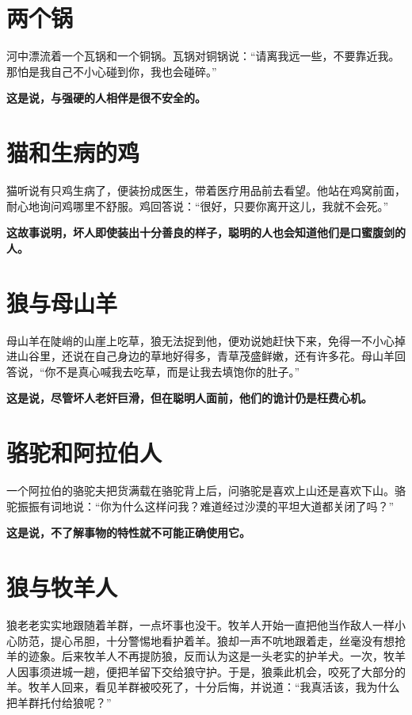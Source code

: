 \section{两个锅}

河中漂流着一个瓦锅和一个铜锅。瓦锅对铜锅说：“请离我远一些，不要靠近我。那怕是我自己不小心碰到你，我也会碰碎。”

{\bfseries \color{red}这是说，与强硬的人相伴是很不安全的。}

\section{猫和生病的鸡}

猫听说有只鸡生病了，便装扮成医生，带着医疗用品前去看望。他站在鸡窝前面，耐心地询问鸡哪里不舒服。鸡回答说：“很好，只要你离开这儿，我就不会死。”

{\bfseries \color{red}这故事说明，坏人即使装出十分善良的样子，聪明的人也会知道他们是口蜜腹剑的人。}

\section{狼与母山羊}

母山羊在陡峭的山崖上吃草，狼无法捉到他，便劝说她赶快下来，免得一不小心掉进山谷里，还说在自己身边的草地好得多，青草茂盛鲜嫩，还有许多花。母山羊回答说，“你不是真心喊我去吃草，而是让我去填饱你的肚子。”

{\bfseries \color{red}这是说，尽管坏人老奸巨滑，但在聪明人面前，他们的诡计仍是枉费心机。}

\section{骆驼和阿拉伯人}

一个阿拉伯的骆驼夫把货满载在骆驼背上后，问骆驼是喜欢上山还是喜欢下山。骆驼振振有词地说：“你为什么这样问我？难道经过沙漠的平坦大道都关闭了吗？”

{\bfseries \color{red}这是说，不了解事物的特性就不可能正确使用它。}

\section{狼与牧羊人}

狼老老实实地跟随着羊群，一点坏事也没干。牧羊人开始一直把他当作敌人一样小心防范，提心吊胆，十分警惕地看护着羊。狼却一声不吭地跟着走，丝毫没有想抢羊的迹象。后来牧羊人不再提防狼，反而认为这是一头老实的护羊犬。一次，牧羊人因事须进城一趟，便把羊留下交给狼守护。于是，狼乘此机会，咬死了大部分的羊。牧羊人回来，看见羊群被咬死了，十分后悔，并说道：“我真活该，我为什么把羊群托付给狼呢？”

